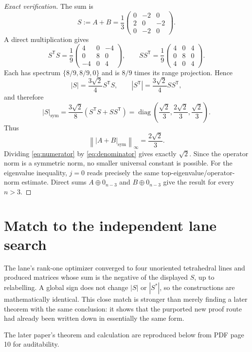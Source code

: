 \documentclass[11pt]{article}
\newcommand{\symmod}[1]{\left|#1\right|_{\mathrm{sym}}}
\newcommand{\opnorm}[1]{\left\lVert#1\right\rVert_{\infty}}
\begin{document}
\begin{proof}[Exact verification]
The sum is
\[
S:=A+B=\frac13
\begin{pmatrix}
0&-2&0\\
2&0&-2\\
0&-2&0
\end{pmatrix}.
\]
A direct multiplication gives
\[
S^{\mathsf T}S=\frac19
\begin{pmatrix}4&0&-4\\0&8&0\\-4&0&4\end{pmatrix},\qquad
SS^{\mathsf T}=\frac19
\begin{pmatrix}4&0&4\\0&8&0\\4&0&4\end{pmatrix}.
\]
Each has spectrum $\{8/9,8/9,0\}$ and is $8/9$ times its range projection. Hence
\[
 |S|=\frac{3\sqrt2}{4}S^{\mathsf T}S,\qquad
 |S^{\mathsf T}|=\frac{3\sqrt2}{4}SS^{\mathsf T},
\]
and therefore
\[
 \symmod{S}
 =\frac{3\sqrt2}{8}(S^{\mathsf T}S+SS^{\mathsf T})
 =\operatorname{diag}\!\left(\frac{\sqrt2}{3},\frac{2\sqrt2}{3},\frac{\sqrt2}{3}\right).
\]
Thus
\begin{equation}\label{eq:numerator}
 \opnorm{\symmod{A+B}}=\frac{2\sqrt2}{3}.
\end{equation}
Dividing \eqref{eq:numerator} by \eqref{eq:denominator} gives exactly $\sqrt2$. Since the operator norm is a symmetric norm, no smaller universal constant is possible. For the eigenvalue inequality, $j=0$ reads precisely the same top-eigenvalue/operator-norm estimate. Direct sums $A\oplus0_{n-3}$ and $B\oplus0_{n-3}$ give the result for every $n>3$.
\end{proof}

\section{Match to the independent lane search}

The lane's rank-one optimizer converged to four unoriented tetrahedral lines and produced matrices whose sum is the negative of the displayed $S$, up to relabelling. A global sign does not change $|S|$ or $|S^*|$, so the constructions are mathematically identical. This close match is stronger than merely finding a later theorem with the same conclusion: it shows that the purported new proof route had already been written down in essentially the same form.

The later paper's theorem and calculation are reproduced below from PDF page 10 for auditability.
\end{document}
